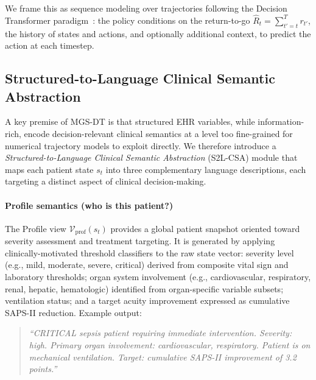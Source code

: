 We frame this as sequence modeling over trajectories following the Decision Transformer paradigm~\cite{chen2021decision}: the policy conditions on the return-to-go $\hat{R}_t = \sum_{t'=t}^{T} r_{t'}$, the history of states and actions, and optionally additional context, to predict the action at each timestep.

\subsection{Structured-to-Language Clinical Semantic Abstraction}
\label{sec:s2l}

A key premise of MGS-DT is that structured EHR variables, while information-rich, encode decision-relevant clinical semantics at a level too fine-grained for numerical trajectory models to exploit directly. We therefore introduce a \textit{Structured-to-Language Clinical Semantic Abstraction} (S2L-CSA) module that maps each patient state $s_t$ into three complementary language descriptions, each targeting a distinct aspect of clinical decision-making.

\paragraph{Profile semantics (who is this patient?)} The Profile view $\mathcal{V}_{\text{prof}}(s_t)$ provides a global patient snapshot oriented toward severity assessment and treatment targeting. It is generated by applying clinically-motivated threshold classifiers to the raw state vector: severity level (e.g., mild, moderate, severe, critical) derived from composite vital sign and laboratory thresholds; organ system involvement (e.g., cardiovascular, respiratory, renal, hepatic, hematologic) identified from organ-specific variable subsets; ventilation status; and a target acuity improvement expressed as cumulative SAPS-II reduction. Example output:
\begin{quote}
\textit{``CRITICAL sepsis patient requiring immediate intervention. Severity: high. Primary organ involvement: cardiovascular, respiratory. Patient is on mechanical ventilation. Target: cumulative SAPS-II improvement of 3.2 points.''}
\end{quote}

